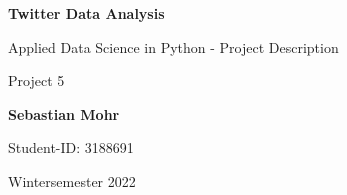 \documentclass[a4paper,10pt]{scrreprt}
\begin{document}
\begin{titlepage}
    \begin{center}
        \vspace*{3cm}
 
        \Huge
        \textbf{Twitter Data Analysis}
 
        \vspace{0.5cm}
        \LARGE
        Applied Data Science in Python - Project Description

        \vspace{0.5cm}

        \large
        Project 5

        \vspace{1.5cm}
 
        \textbf{Sebastian Mohr}\\

        \vspace{1cm}

        \large 
        Student-ID: 3188691

        \vspace{0.5cm}

        Wintersemester 2022
	\vspace{\fill}
    \end{center}
\end{titlepage}
\end{document}
